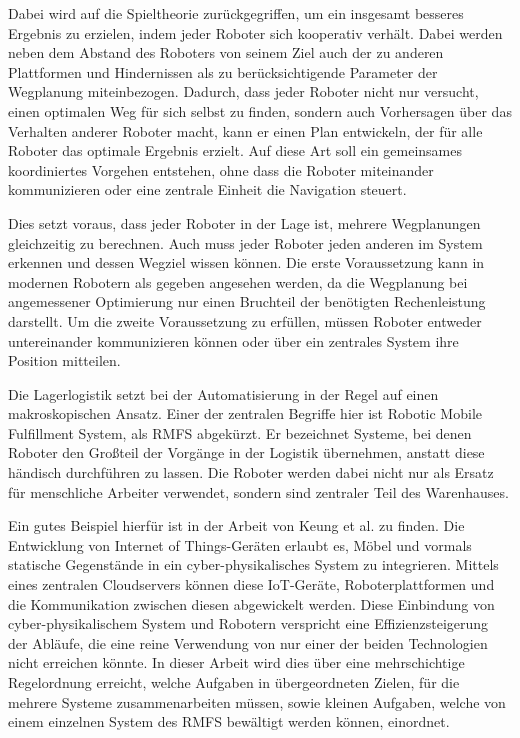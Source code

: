 Dabei wird auf die Spieltheorie zurückgegriffen, um ein insgesamt besseres Ergebnis zu erzielen, indem jeder Roboter sich kooperativ verhält. Dabei werden neben dem Abstand des Roboters von seinem Ziel auch der zu anderen Plattformen und Hindernissen als zu berücksichtigende Parameter der Wegplanung miteinbezogen. Dadurch, dass jeder Roboter nicht nur versucht, einen optimalen Weg für sich selbst zu finden, sondern auch Vorhersagen über das Verhalten anderer Roboter macht, kann er einen Plan entwickeln, der für alle Roboter das optimale Ergebnis erzielt. Auf diese Art soll ein gemeinsames koordiniertes Vorgehen entstehen, ohne dass die Roboter miteinander kommunizieren oder eine zentrale Einheit die Navigation steuert.

Dies setzt voraus, dass jeder Roboter in der Lage ist, mehrere Wegplanungen gleichzeitig zu berechnen. Auch muss jeder Roboter jeden anderen im System erkennen und dessen Wegziel wissen können. Die erste Voraussetzung kann in modernen Robotern als gegeben angesehen werden, da die Wegplanung bei angemessener Optimierung nur einen Bruchteil der benötigten Rechenleistung darstellt. Um die zweite Voraussetzung zu erfüllen, müssen Roboter entweder untereinander kommunizieren können oder über ein zentrales System ihre Position mitteilen.

Die Lagerlogistik setzt bei der Automatisierung in der Regel auf einen makroskopischen Ansatz. Einer der zentralen Begriffe hier ist Robotic Mobile Fulfillment System, als RMFS abgekürzt. Er bezeichnet Systeme, bei denen Roboter den Großteil der Vorgänge in der Logistik übernehmen, anstatt diese händisch durchführen zu lassen. Die Roboter werden dabei nicht nur als Ersatz für menschliche Arbeiter verwendet, sondern sind zentraler Teil des Warenhauses.

Ein gutes Beispiel hierfür ist in der Arbeit von Keung et al. \cite{cloudFullfillment} zu finden. Die Entwicklung von Internet of Things-Geräten erlaubt es, Möbel und vormals statische Gegenstände in ein cyber-physikalisches System zu integrieren. Mittels eines zentralen Cloudservers können diese IoT-Geräte, Roboterplattformen und die Kommunikation zwischen diesen abgewickelt werden. Diese Einbindung von cyber-physikalischem System und Robotern verspricht eine Effizienzsteigerung der Abläufe, die eine reine Verwendung von nur einer der beiden Technologien nicht erreichen könnte. In dieser Arbeit wird dies über eine mehrschichtige Regelordnung erreicht, welche Aufgaben in übergeordneten Zielen, für die mehrere Systeme zusammenarbeiten müssen, sowie kleinen Aufgaben, welche von einem einzelnen System des RMFS bewältigt werden können, einordnet.

